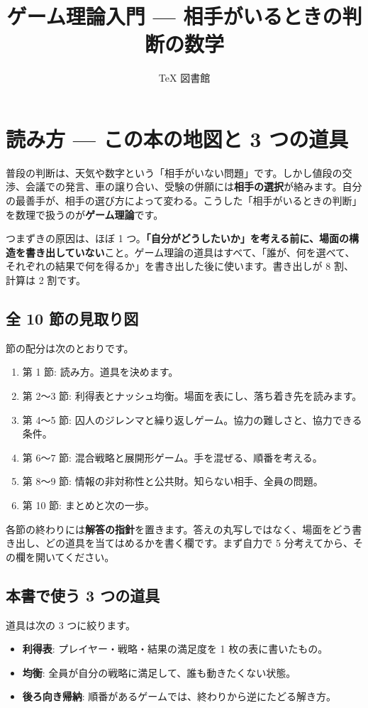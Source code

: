 \documentclass{article}
\title{ゲーム理論入門 — 相手がいるときの判断の数学}
\author{TeX 図書館}
\begin{document}
\section{読み方 — この本の地図と 3 つの道具}

普段の判断は、天気や数字という「相手がいない問題」です。しかし値段の交渉、会議での発言、車の譲り合い、受験の併願には\textbf{相手の選択}が絡みます。自分の最善手が、相手の選び方によって変わる。こうした「相手がいるときの判断」を数理で扱うのが\textbf{ゲーム理論}です。

つまずきの原因は、ほぼ 1 つ。\textbf{「自分がどうしたいか」を考える前に、場面の構造を書き出していない}こと。ゲーム理論の道具はすべて、「誰が、何を選べて、それぞれの結果で何を得るか」を書き出した後に使います。書き出しが 8 割、計算は 2 割です。

\subsection{全 10 節の見取り図}

節の配分は次のとおりです。

\begin{enumerate}
\item 第 1 節: 読み方。道具を決めます。
\item 第 2〜3 節: 利得表とナッシュ均衡。場面を表にし、落ち着き先を読みます。
\item 第 4〜5 節: 囚人のジレンマと繰り返しゲーム。協力の難しさと、協力できる条件。
\item 第 6〜7 節: 混合戦略と展開形ゲーム。手を混ぜる、順番を考える。
\item 第 8〜9 節: 情報の非対称性と公共財。知らない相手、全員の問題。
\item 第 10 節: まとめと次の一歩。
\end{enumerate}

各節の終わりには\textbf{解答の指針}を置きます。答えの丸写しではなく、場面をどう書き出し、どの道具を当てはめるかを書く欄です。まず自力で 5 分考えてから、その欄を開いてください。

\subsection{本書で使う 3 つの道具}

道具は次の 3 つに絞ります。

\begin{itemize}
\item \textbf{利得表}: プレイヤー・戦略・結果の満足度を 1 枚の表に書いたもの。
\item \textbf{均衡}: 全員が自分の戦略に満足して、誰も動きたくない状態。
\item \textbf{後ろ向き帰納}: 順番があるゲームでは、終わりから逆にたどる解き方。
\end{itemize}
\end{document}
